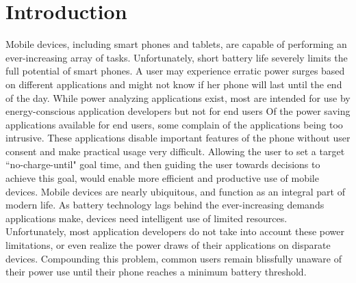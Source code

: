 \section*{Introduction}
Mobile devices, including smart phones and tablets, are capable of performing an ever-increasing array of tasks. 
Unfortunately, short battery life severely limits the full potential of smart phones. 
A user may experience erratic power surges based on different applications and might not know if her phone will last until the end of the day. 
While power analyzing applications exist, most are intended for use by energy-conscious application developers but not for end users %
Of the power saving applications available for end users, some complain of the applications being too intrusive. 
These applications disable important features of the phone without user consent and make practical usage very difficult. 
Allowing the user to set a target ``no-charge-until" goal time, and then guiding the user towards decisions to achieve this goal, would enable more efficient and productive use of mobile devices.
Mobile devices are nearly ubiquitous, and function as an integral part of modern life. 
As battery technology lags behind the ever-increasing demands applications make, devices need intelligent use of limited resources. 
Unfortunately, most application developers do not take into account these power limitations, or even realize the power draws of their applications on disparate devices. 
Compounding this problem, common users remain blissfully unaware of their power use until their phone reaches a minimum battery threshold.

